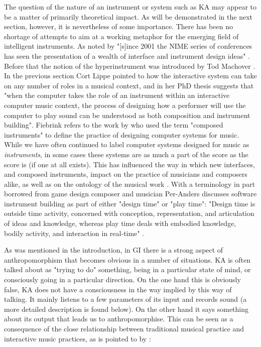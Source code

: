 \documentclass[11pt]{article}
\begin{document}
The question of the nature of an instrument or system such as KA may
appear to be a matter of primarily theoretical impact. As will be
demonstrated in the next section, however, it is nevertheless of some
importance. There has been no shortage of attempts to aim at a working
metaphor for the emerging field of intelligent instruments. As noted
by \citeauthor[5]{Bowers2005} "[s]ince 2001 the NIME series of
conferences has seen the presentation of a wealth of interface and
instrument design ideas" . Before that the
notion of the hyperinstrument was introduced by Tod Machover
\citep{Macover1989}.  In the previous section Cort Lippe pointed to
how the interactive system can take on any number of roles in a
musical context, and in her PhD thesis \citeauthor[17]{Fiebrink2011}
suggests that "when the computer takes the role of an instrument
within an interactive computer music context, the process of designing
how a performer will use the computer to play sound can be understood
as both composition and instrument building". Fiebrink refers to the
work by \citeauthor{Schnell2002} who used the term "composed
instruments" \citep{Schnell2002} to define the practice of designing
computer systems for music. While we have often continued to label
computer systems designed for music as \emph{instruments}, in some
cases these systems are as much a part of the score as the score is
(if one at all exists). This has influenced the way in which new
interfaces, and composed instruments, impact on the practice of
musicians and composers alike, as well as on the ontology of the
musical work \citep{frisk-ost06-2,frisk-ost06}. With a terminology in
part borrowed from game design composer and musician Per-Anders
\citeauthor{Nilsson2011} discusses software instrument building as
part of either "design time" or "play time": "Design time is outside
time activity, concerned with conception, representation, and
articulation of ideas and knowledge, whereas play time deals with
embodied knowledge, bodily activity, and interaction in real-time"
\citep[2]{Nilsson2011}.

As was mentioned in the introduction, in GI there is a strong aspect
of anthropomorphism that becomes obvious in a number of situations. KA
is often talked about as "trying to do" something, being in a
particular state of mind, or consciously going in a particular
direction. On the one hand this is obviously false, KA does not have a
consciousness in the way implied by this way of talking. It mainly
listens to a few parameters of its input and records sound (a more
detailed description is found below). On the other hand it says
something about its output that leads us to anthropomorphise. This can
be seen as a consequence of the close relationship between traditional
musical practice and interactive music practices, as is pointed to by
\citeauthor{Schnell2002}:
\end{document}
